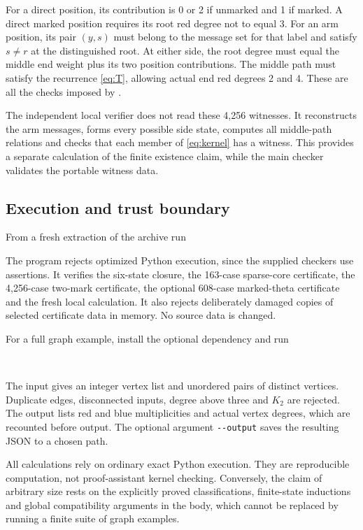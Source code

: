 For a direct position, its contribution is 0 or 2 if unmarked and
1 if marked.  A direct marked position requires its root red degree
not to equal 3.  For an arm position, its pair $(y,s)$ must belong
to the message set for that label and satisfy $s\ne r$ at the
distinguished root.  At either side, the root degree must equal
the middle end weight plus its two position contributions.  The
middle path must satisfy the recurrence \eqref{eq:T}, allowing actual
end red degrees 2 and 4.  These are all the checks imposed by
.

The independent local verifier does not read these 4,256 witnesses.
It reconstructs the arm messages, forms every possible side state,
computes all middle-path relations and checks that each member of
\eqref{eq:kernel} has a witness.  This provides a separate calculation
of the finite existence claim, while the main checker validates the
portable witness data.

\subsection{Execution and trust boundary}

From a fresh extraction of the archive run
\begin{center}\end{center}
The program rejects optimized Python execution, since the supplied
checkers use assertions.  It verifies the six-state closure, the
163-case sparse-core certificate, the 4,256-case two-mark certificate,
the optional 608-case marked-theta certificate and the fresh local
calculation.  It also rejects deliberately damaged copies of selected
certificate data in memory.  No source data is changed.

For a full graph example, install the optional dependency and run
\begin{center}
\\
\end{center}
The input gives an integer vertex list and unordered pairs of distinct
vertices.  Duplicate edges, disconnected inputs, degree above three
and $K_2$ are rejected.  The output lists red and blue multiplicities
and actual vertex degrees, which are recounted before output.
The optional argument \texttt{-{}-output} saves the resulting JSON to a
chosen path.

All calculations rely on ordinary exact Python execution.  They are
reproducible computation, not proof-assistant kernel checking.
Conversely, the claim of arbitrary size rests on the explicitly
proved classifications, finite-state inductions and global
compatibility arguments in the body, which cannot be replaced by
running a finite suite of graph examples.
